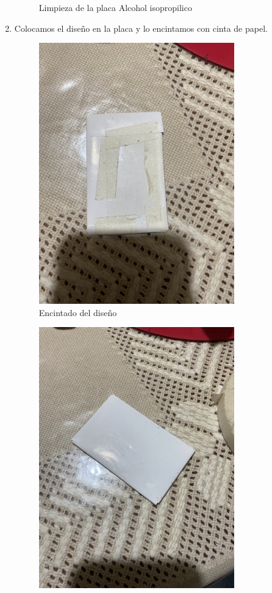 \documentclass[12pt]{report}
\begin{document}
\begin{enumerate}
\begin{figure}[H]
            \caption{Limpieza de la placa Alcohol isopropilico}
        \end{figure}
  \item Colocamos el diseño en la placa y lo encintamos con cinta de papel.
        \begin{figure}[H]
            \centering
            \includegraphics[width=0.8\textwidth]{screenshots/img4.jpg}
            \caption{Encintado del diseño}
        \end{figure}
        \begin{figure}[H]
          \centering
          \includegraphics[width=0.8\textwidth]{screenshots/img5.jpg}

\end{figure}
\end{enumerate}
\end{document}
